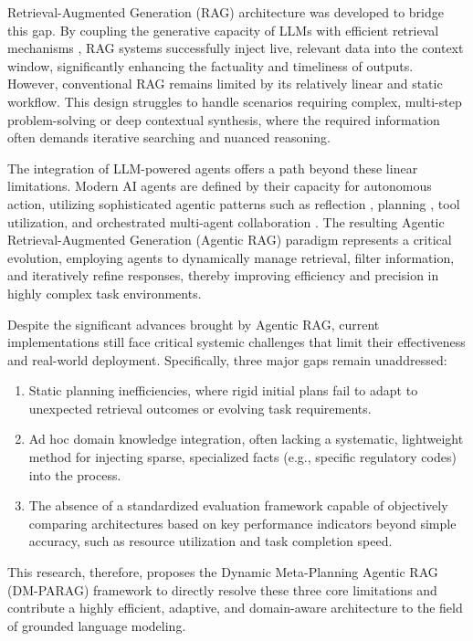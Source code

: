 \documentclass[12pt,en]{elegantpaper}
\begin{document}
Retrieval-Augmented Generation (RAG) architecture \cite{singh2025agentic,zhao2024retrieval} was developed to bridge this gap. By coupling the generative capacity of LLMs with efficient retrieval mechanisms \cite{jiang2023active}, RAG systems successfully inject live, relevant data into the context window, significantly enhancing the factuality and timeliness of outputs. However, conventional RAG remains limited by its relatively linear and static workflow. This design struggles to handle scenarios requiring complex, multi-step problem-solving \cite{wei2022chain} or deep contextual synthesis, where the required information often demands iterative searching and nuanced reasoning.

The integration of LLM-powered agents \cite{anthropic2024effective} offers a path beyond these linear limitations. Modern AI agents are defined by their capacity for autonomous action, utilizing sophisticated agentic patterns such as reflection \cite{ravuru2024agentic, shinn2023reflexion}, planning \cite{huang2023towards}, tool utilization, and orchestrated multi-agent collaboration \cite{peng2024graph}. The resulting Agentic Retrieval-Augmented Generation (Agentic RAG) paradigm \cite{ravuru2024agentic} represents a critical evolution, employing agents to dynamically manage retrieval, filter information, and iteratively refine responses, thereby improving efficiency and precision in highly complex task environments.

Despite the significant advances brought by Agentic RAG, current implementations still face critical systemic challenges that limit their effectiveness and real-world deployment. Specifically, three major gaps remain unaddressed: 

\begin{enumerate}
  \item Static planning inefficiencies, where rigid initial plans fail to adapt to unexpected retrieval outcomes or evolving task requirements.
  \item Ad hoc domain knowledge integration, often lacking a systematic, lightweight method for injecting sparse, specialized facts (e.g., specific regulatory codes) into the process.
  \item The absence of a standardized evaluation framework capable of objectively comparing architectures based on key performance indicators beyond simple accuracy, such as resource utilization and task completion speed.
\end{enumerate}

This research, therefore, proposes the Dynamic Meta-Planning Agentic RAG (DM-PARAG) framework to directly resolve these three core limitations and contribute a highly efficient, adaptive, and domain-aware architecture to the field of grounded language modeling.
\end{document}
